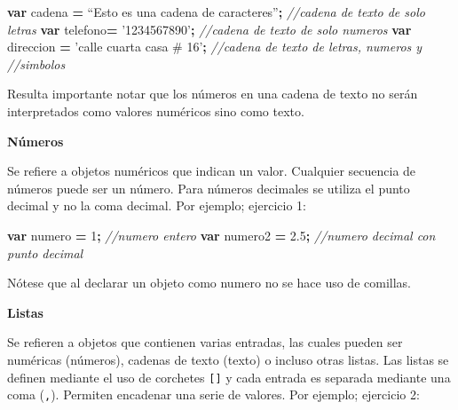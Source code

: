\documentclass[
]{article}
\newenvironment{Shaded}{\begin{snugshade}}{\end{snugshade}}
\newcommand{\CommentTok}[1]{\textcolor[rgb]{0.56,0.35,0.01}{\textit{#1}}}
\newcommand{\DecValTok}[1]{\textcolor[rgb]{0.00,0.00,0.81}{#1}}
\newcommand{\FloatTok}[1]{\textcolor[rgb]{0.00,0.00,0.81}{#1}}
\newcommand{\KeywordTok}[1]{\textcolor[rgb]{0.13,0.29,0.53}{\textbf{#1}}}
\newcommand{\NormalTok}[1]{#1}
\newcommand{\OperatorTok}[1]{\textcolor[rgb]{0.81,0.36,0.00}{\textbf{#1}}}
\newcommand{\StringTok}[1]{\textcolor[rgb]{0.31,0.60,0.02}{#1}}
\begin{document}
\begin{Shaded}
\begin{Highlighting}[]
\KeywordTok{var}\NormalTok{ cadena }\OperatorTok{=}\NormalTok{ “Esto es una cadena de caracteres”}\OperatorTok{;}  \CommentTok{//cadena de texto de solo letras}
\KeywordTok{var}\NormalTok{ telefono}\OperatorTok{=} \StringTok{'1234567890'}\OperatorTok{;}                       \CommentTok{//cadena de texto de solo numeros}
\KeywordTok{var}\NormalTok{ direccion }\OperatorTok{=} \StringTok{'calle cuarta casa # 16'}\OperatorTok{;}         \CommentTok{//cadena de texto de letras, numeros y}
\CommentTok{//simbolos}
\end{Highlighting}
\end{Shaded}

\begin{tipblock}
Resulta importante notar que los números en una cadena de texto no serán
interpretados como valores numéricos sino como texto.

\end{tipblock}

\textbf{Números}

Se refiere a objetos numéricos que indican un valor. Cualquier secuencia
de números puede ser un número. Para números decimales se utiliza el
punto decimal y no la coma decimal. Por ejemplo; ejercicio 1:

\begin{Shaded}
\begin{Highlighting}[]
\KeywordTok{var}\NormalTok{ numero }\OperatorTok{=} \DecValTok{1}\OperatorTok{;}     \CommentTok{//numero entero}
\KeywordTok{var}\NormalTok{ numero2 }\OperatorTok{=} \FloatTok{2.5}\OperatorTok{;}  \CommentTok{//numero decimal con punto decimal}
\end{Highlighting}
\end{Shaded}

Nótese que al declarar un objeto como numero no se hace uso de comillas.

\textbf{Listas}

Se refieren a objetos que contienen varias entradas, las cuales pueden
ser numéricas (números), cadenas de texto (texto) o incluso otras
listas. Las listas se definen mediante el uso de corchetes
\texttt{{[}{]}} y cada entrada es separada mediante una coma
(\texttt{,}). Permiten encadenar una serie de valores. Por ejemplo;
ejercicio 2:
\end{document}
